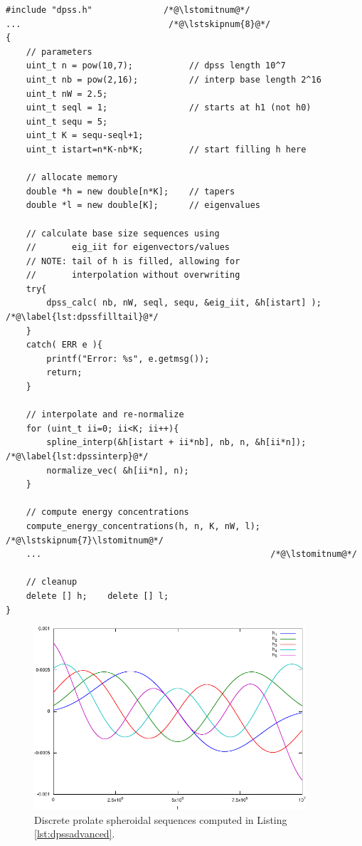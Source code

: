 \begin{lstlisting}[label=lst:dpssadvanced,caption=A \texttt{dpss} advanced example ]
#include "dpss.h"              /*@\lstomitnum@*/
...                             /*@\lstskipnum{8}@*/
{
    // parameters
    uint_t n = pow(10,7);           // dpss length 10^7
    uint_t nb = pow(2,16);          // interp base length 2^16
    uint_t nW = 2.5;
    uint_t seql = 1;                // starts at h1 (not h0)
    uint_t sequ = 5;
    uint_t K = sequ-seql+1;
    uint_t istart=n*K-nb*K;         // start filling h here    

    // allocate memory
    double *h = new double[n*K];    // tapers
    double *l = new double[K];      // eigenvalues

    // calculate base size sequences using 
    //       eig_iit for eigenvectors/values
    // NOTE: tail of h is filled, allowing for 
    //       interpolation without overwriting
    try{
        dpss_calc( nb, nW, seql, sequ, &eig_iit, &h[istart] ); /*@\label{lst:dpssfilltail}@*/
    } 
    catch( ERR e ){
        printf("Error: %s", e.getmsg());
        return;
    }
    
    // interpolate and re-normalize
    for (uint_t ii=0; ii<K; ii++){
        spline_interp(&h[istart + ii*nb], nb, n, &h[ii*n]); /*@\label{lst:dpssinterp}@*/
        normalize_vec( &h[ii*n], n);
    }

    // compute energy concentrations
    compute_energy_concentrations(h, n, K, nW, l);  /*@\lstskipnum{7}\lstomitnum@*/
    ...                                             /*@\lstomitnum@*/

    // cleanup
    delete [] h;    delete [] l;
}
\end{lstlisting}
\medskip

\begin{figure}[!hb]
    \centering
    \includegraphics[width=0.9\textwidth]{pics/dpss1e+07.pdf}
    \vspace*{-0.5em}

    \caption[Advanced DPSS Example]{Discrete prolate spheroidal sequences computed in Listing \ref{lst:dpssadvanced}.\label{fig:dpssadvanced}}
    \vspace*{-0.5in}
\end{figure}

